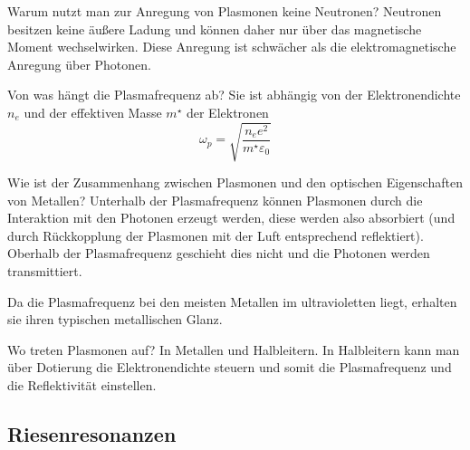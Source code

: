 
\begin{fquestion}{Warum nutzt man zur Anregung von Plasmonen keine Neutronen?}
    Neutronen besitzen keine äußere Ladung und können daher nur über das magnetische Moment wechselwirken.
    Diese Anregung ist schwächer als die elektromagnetische Anregung über Photonen.
\end{fquestion}

\begin{fquestion}{Von was hängt die Plasmafrequenz ab?}
    Sie ist abhängig von der Elektronendichte $n_e$ und der effektiven Masse $m^\star$ der Elektronen 
    \[\omega_p = \sqrt{\frac{n_e e^2}{m^\star \varepsilon_0}}\]
\end{fquestion}

\begin{fquestion}{Wie ist der Zusammenhang zwischen Plasmonen und den optischen Eigenschaften von Metallen?}
    Unterhalb der Plasmafrequenz können Plasmonen durch die Interaktion mit den Photonen erzeugt werden, diese werden also absorbiert (und durch Rückkopplung der Plasmonen mit der Luft entsprechend reflektiert).
    Oberhalb der Plasmafrequenz geschieht dies nicht und die Photonen werden transmittiert.
    
    Da die Plasmafrequenz bei den meisten Metallen im ultravioletten liegt, erhalten sie ihren typischen metallischen Glanz.
\end{fquestion}


\begin{fquestion}{Wo treten Plasmonen auf?}
    In Metallen und Halbleitern. 
    In Halbleitern kann man über Dotierung die Elektronendichte steuern und somit die Plasmafrequenz und die Reflektivität einstellen.
\end{fquestion}

\subsection{Riesenresonanzen}


